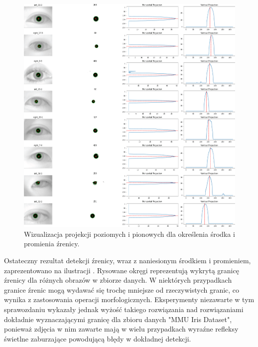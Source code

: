 \documentclass[a4paper]{article}
\begin{document}
\begin{figure}[H]
    \centering
    \includegraphics[width=0.9\linewidth]{figures/pupils_projections_many.png}
    \caption{Wizualizacja projekcji poziomych i pionowych dla określenia środka i promienia źrenicy.}
    \label{fig:pupils_projections_many}
\end{figure}

Ostateczny rezultat detekcji źrenicy, wraz z naniesionym środkiem i promieniem, zaprezentowano na ilustracji . Rysowane okręgi reprezentują wykrytą granicę źrenicy dla różnych obrazów w zbiorze danych. W niektórych przypadkach granice źrenic mogą wydawać się trochę mniejsze od rzeczywistych granic, co wynika z zastosowania operacji morfologicznych. Eksperymenty niezawarte w tym sprawozdaniu wykazały jednak wyżość takiego rozwiązania nad rozwiązaniami dokładnie wyznaczającymi granicę dla zbioru danych "MMU Iris Dataset", ponieważ zdjęcia w nim zawarte mają w wielu przypadkach wyraźne refleksy świetlne zaburzające powodującą błędy w dokładnej detekcji.
\end{document}
